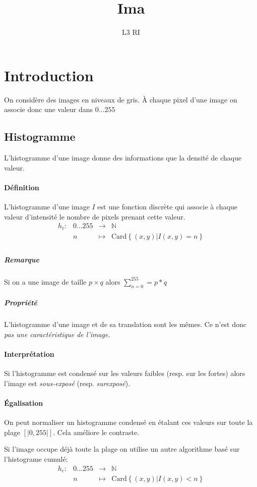 \documentclass[french]{article}
\title{Ima}
\date{}
\author{L3 RI}
\begin{document}
\maketitle
\tableofcontents
\newpage

\section{Introduction}
On considère des images en niveaux de gris. À chaque pixel d'une image
on associe donc une valeur dans ${0\dots255}$
\subsection{Histogramme}
L'histogramme d'une image donne des informations que la densité de
chaque valeur.
\paragraph{Définition} L'histogramme d'une image $I$ est une fonction
discrète qui associe à chaque valeur d’intensité le nombre de pixels
prenant cette valeur.
$$
\begin{array}{rccl}
h_t : & {0\dots255} & \to & \mathbb{N} \\
 & n & \mapsto & \text{Card}\left\{(x,y) | I(x,y) = n\right\}\\
\end{array}
$$
\subparagraph{Remarque} Si on a une image de taille $p\times q$ alors
$\sum_{n = 0}^{255} = p*q$

\subparagraph{Propriété} L'histogramme d'une image et de sa translation
sont les mêmes. Ce n'est donc \emph{pas une caractéristique de l'image}.

\paragraph{Interprétation} Si l'histogramme est condensé sur les valeurs
faibles (resp. sur les fortes) alors l'image est \emph{sous-exposé} (resp.
\emph{surexposé}).

\paragraph{Égalisation} On peut normaliser un histogramme condensé en
étalant ces valeurs sur toute la plage $[|0, 255|]$. Cela améliore le
contraste.

Si l'image occupe déjà toute la plage on utilise un autre algorithme basé
sur l'histograme cumulé:
$$
\begin{array}{rccl}
h_c : & {0\dots255} & \to & \mathbb{N} \\
 & n & \mapsto & \text{Card}\left\{(x,y) | I(x,y) < n\right\}\\
\end{array}
$$
\end{document}
